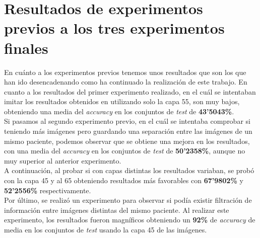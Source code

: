 
\section{Resultados de experimentos previos a los tres experimentos finales}
\label{experimentosprevios-resultados}
En cuánto a los experimentos previos tenemos unos resultados que son los que han ido desencadenando como ha continuado la realización de este trabajo. En cuanto a los resultados del primer experimento realizado, en el cuál se intentaban imitar los resultados obtenidos en \cite{residualVGG} utilizando solo la capa 55, son muy bajos, obteniendo una media del \textit{accuracy} en los conjuntos de \textit{test} de \textbf{43'5043\%}.\\

Si pasamos al segundo experimento previo, en el cuál se intentaba comprobar si teniendo más imágenes pero guardando una separación entre las imágenes de un mismo paciente, podemos observar que se obtiene una mejora en los resultados, con una media del \textit{accuracy} en los conjuntos de \textit{test} de \textbf{ 50'2358\%}, aunque no muy superior al anterior experimento.\\

A continuación, al probar si con capas distintas los resultados variaban, se probó con la capa 45 y al 65 obteniendo resultados más favorables con \textbf{67'9802\%} y \textbf{52'2556\%} respectivamente.\\

Por último, se realizó un experimento para observar si podía existir filtración de información entre imágenes distintas del mismo paciente. Al realizar este experimento, los resultados fueron magníficos obteniendo un \textbf{92\%} de \textit{accuracy} de media en los conjuntos de \textit{test} usando la capa 45 de las imágenes.\\

